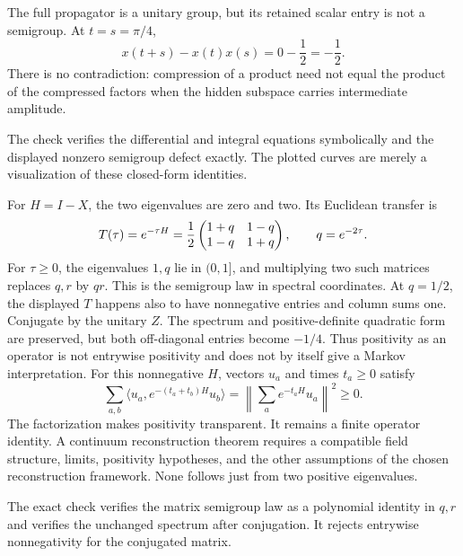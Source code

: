 The full propagator is a unitary group, but its retained scalar entry is not a semigroup. At $t=s=\pi/4$,
\[
x(t+s)-x(t)x(s)=0-\frac12=-\frac12.
\]
There is no contradiction: compression of a product need not equal the product of the compressed factors when the hidden subspace carries intermediate amplitude.

The check verifies the differential and integral equations symbolically and the displayed nonzero semigroup defect exactly. The plotted curves are merely a visualization of these closed-form identities.

For $H=I-X$, the two eigenvalues are zero and two. Its Euclidean transfer is
\[
T(\tau)=e^{-\tau H}
=\frac12\begin{pmatrix}1+q&1-q\\1-q&1+q\end{pmatrix},\qquad q=e^{-2\tau}.
\]
For $\tau\ge0$, the eigenvalues $1,q$ lie in $(0,1]$, and multiplying two such matrices replaces $q,r$ by $qr$. This is the semigroup law in spectral coordinates.
At $q=1/2$, the displayed $T$ happens also to have nonnegative entries and column sums one. Conjugate by the unitary $Z$. The spectrum and positive-definite quadratic form are preserved, but both off-diagonal entries become $-1/4$. Thus positivity as an operator is not entrywise positivity and does not by itself give a Markov interpretation.
For this nonnegative $H$, vectors $u_a$ and times $t_a\ge0$ satisfy
\[
\sum_{a,b}\langle u_a,e^{-(t_a+t_b)H}u_b\rangle
=\left\|\sum_a e^{-t_aH}u_a\right\|^2\ge0.
\]
The factorization makes positivity transparent. It remains a finite operator identity. A continuum reconstruction theorem requires a compatible field structure, limits, positivity hypotheses, and the other assumptions of the chosen reconstruction framework. None follows just from two positive eigenvalues.

The exact check verifies the matrix semigroup law as a polynomial identity in $q,r$ and verifies the unchanged spectrum after conjugation. It rejects entrywise nonnegativity for the conjugated matrix.

